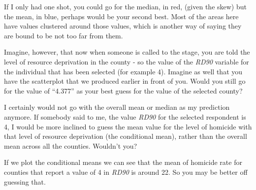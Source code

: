 \documentclass[]{book}
\begin{document}
If I only had one shot, you could go for the median, in red, (given the skew) but the mean, in blue, perhaps would be your second best. Most of the areas here have values clustered around those values, which is another way of saying they are bound to be not too far from them.

Imagine, however, that now when someone is called to the stage, you are told the level of resource deprivation in the county - so the value of the \emph{RD90} variable for the individual that has been selected (for example 4). Imagine as well that you have the scatterplot that we produced earlier in front of you. Would you still go for the value of ``4.377'' as your best guess for the value of the selected county?

I certainly would not go with the overall mean or median as my prediction anymore. If somebody said to me, the value \emph{RD90} for the selected respondent is 4, I would be more inclined to guess the mean value for the level of homicide with that level of resource deprivation (the conditional mean), rather than the overall mean across all the counties. Wouldn't you?

If we plot the conditional means we can see that the mean of homicide rate for counties that report a value of 4 in \emph{RD90} is around 22. So you may be better off guessing that.
\end{document}
